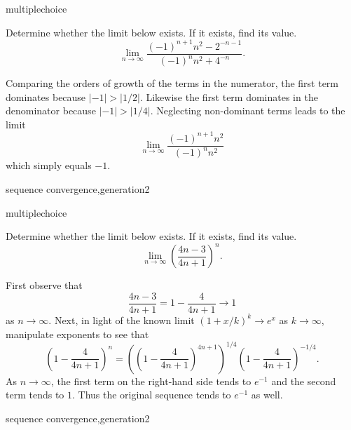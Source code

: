\documentclass{ximera}
\begin{document}
\begin{question}[SeqConvORDER19]
\begin{type}
multiplechoice
\end{type}
Determine whether the limit below exists. If it exists, find its value.
\[\lim_{n \rightarrow \infty} \frac{(-1)^{n+1}n^2 - 2^{-n-1}}{(-1)^{n}n^2 + 4^{-n}}.\] 
\begin{multiplechoice}
\end{multiplechoice}
\begin{feedback}
Comparing the orders of growth of the terms in the numerator, the first term dominates because \(|-1|>|1/2|\). Likewise the first term dominates in the denominator because  \(|-1|>|1/4|\). Neglecting non-dominant terms leads to the limit \[\lim_{n \rightarrow \infty} \frac{(-1)^{n+1}n^2}{(-1)^{n}n^2}\] which simply equals \(-1\).
\end{feedback}
\begin{keywords}
sequence convergence,generation2
\end{keywords}
\end{question}

\begin{question}[SeqConvEXPN43]
\begin{type}
multiplechoice
\end{type}
Determine whether the limit below exists. If it exists, find its value.
\[\lim_{n \rightarrow \infty} \left(\frac{4n - 3}{4n + 1}\right)^{n}.\] 
\begin{multiplechoice}
\end{multiplechoice}
\begin{feedback}
First observe that 
\[\frac{4n - 3}{4n + 1} = 1 - \frac{4}{4n + 1} \rightarrow 1\]
as \(n \rightarrow \infty\). Next, in light of the known limit \((1+x/k)^{k} \rightarrow e^x\) as \(k \rightarrow \infty\), manipulate exponents to see that  \[\left(1 - \frac{4}{4n + 1}\right)^n = \left( \left(1 - \frac{4}{4n + 1}\right)^{4n + 1} \right)^{ 1/4} \left(1 - \frac{4}{4n + 1}\right)^{-1/4}. \] As \(n \rightarrow \infty\), the first term on the right-hand side tends to \(e^{-1}\) and the second term tends to \(1\). Thus the original sequence tends to \(e^{-1}\) as well.
\end{feedback}
\begin{keywords}
sequence convergence,generation2
\end{keywords}
\end{question}
\end{document}
